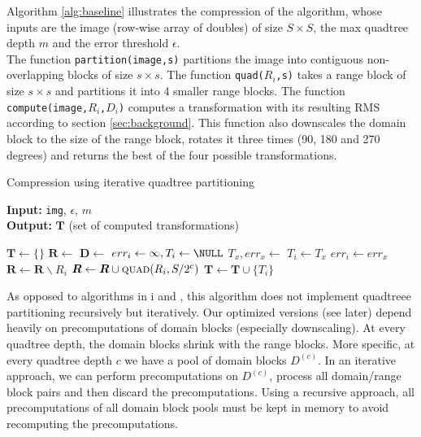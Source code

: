 Algorithm \ref{alg:baseline} illustrates the compression of the algorithm, whose inputs are the image (row-wise array of doubles) of size $S \times S$,
the max quadtree depth $m$ and the error threshold $\epsilon$.\\
The function \texttt{partition(image,s)} partitions the image into contiguous non-overlapping blocks of size $s \times s$.
The function \texttt{quad($R_i$,s)} takes a range block of size $s \times s$ and partitions it into 4 smaller range blocks.
The function \texttt{compute(image,$R_i$,$D_i$)} computes a transformation with its resulting RMS according to section \ref{sec:background}. 
This function also downscales the domain block to the size of the range block, rotates it three times (90, 180 and 270 degrees) 
and returns the best of the four possible transformations.
\begin{algorithm}
\caption{Compression using iterative quadtree partitioning}\label{alg:baseline}
\hspace*{\algorithmicindent} \textbf{Input:} \texttt{img}, $\epsilon$, $m$ \\
\hspace*{\algorithmicindent} \textbf{Output:} $\boldsymbol{T}$ (set of computed transformations)
\begin{algorithmic}[1]
  \State $\boldsymbol{T} \gets \{\}$
  \State $\boldsymbol{R} \gets $ 
        \State $\boldsymbol{D} \gets $ 
            \State $err_i \gets \infty, T_i \gets \NULL$
              \State $T_x, err_x \gets $ 
                \State $T_i \gets T_x$
                \State $err_i \gets err_x$
              \EndIf
            \EndFor
        \EndFor
        \State $\boldsymbol{R} \gets \boldsymbol{R} \backslash  R_i$
          \State $\boldsymbol{R} \gets \boldsymbol{R} \cup  \Call{quad}{R_i, S/2^c}$
        \Else
          \State $\boldsymbol{T} \gets \boldsymbol{T} \cup \{T_i\}$
        \EndIf
    \EndFor
\end{algorithmic}
\end{algorithm}

As opposed to algorithms in \cite{fisher2012}i and \cite{github-cpp}, this algorithm does not implement quadtreee
partitioning recursively but iteratively.
Our optimized versions (see later) depend heavily on precomputations of domain blocks (especially downscaling).
At every quadtree depth, the domain blocks shrink with the range blocks. More specific, at every quadtree depth $c$ we have a pool of
domain blocks $D^{(c)}$. In an iterative approach, we can perform precomputations on $D^{(c)}$, process all domain/range block pairs 
and then discard the precomputations. Using a recursive approach, all precomputations of all domain block pools must be kept in memory
to avoid recomputing the precomputations.

